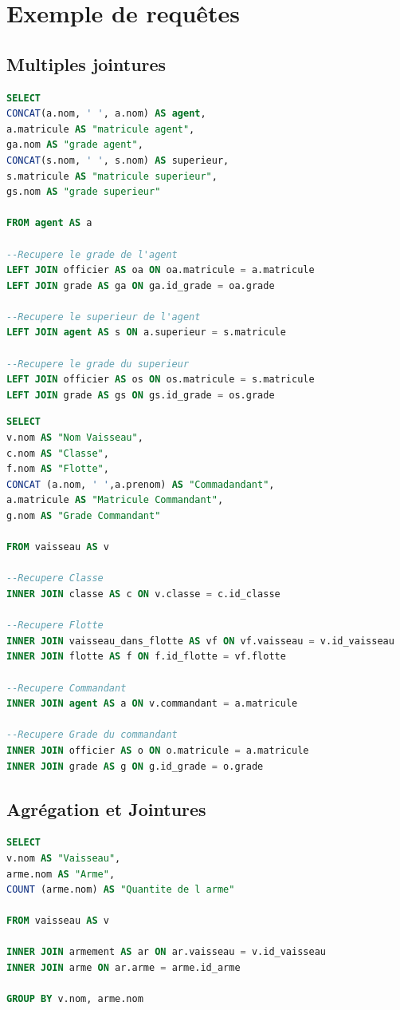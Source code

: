 \section{Exemple de requêtes}

\subsection{Multiples jointures}
\begin{lstlisting}[language=SQL]
SELECT
CONCAT(a.nom, ' ', a.nom) AS agent,
a.matricule AS "matricule agent",
ga.nom AS "grade agent",
CONCAT(s.nom, ' ', s.nom) AS superieur,
s.matricule AS "matricule superieur",
gs.nom AS "grade superieur"

FROM agent AS a

--Recupere le grade de l'agent
LEFT JOIN officier AS oa ON oa.matricule = a.matricule
LEFT JOIN grade AS ga ON ga.id_grade = oa.grade

--Recupere le superieur de l'agent
LEFT JOIN agent AS s ON a.superieur = s.matricule

--Recupere le grade du superieur
LEFT JOIN officier AS os ON os.matricule = s.matricule
LEFT JOIN grade AS gs ON gs.id_grade = os.grade
\end{lstlisting}

\begin{lstlisting}[language=SQL]
SELECT
v.nom AS "Nom Vaisseau",
c.nom AS "Classe",
f.nom AS "Flotte",
CONCAT (a.nom, ' ',a.prenom) AS "Commadandant",
a.matricule AS "Matricule Commandant",
g.nom AS "Grade Commandant"

FROM vaisseau AS v

--Recupere Classe
INNER JOIN classe AS c ON v.classe = c.id_classe

--Recupere Flotte
INNER JOIN vaisseau_dans_flotte AS vf ON vf.vaisseau = v.id_vaisseau
INNER JOIN flotte AS f ON f.id_flotte = vf.flotte

--Recupere Commandant
INNER JOIN agent AS a ON v.commandant = a.matricule

--Recupere Grade du commandant
INNER JOIN officier AS o ON o.matricule = a.matricule
INNER JOIN grade AS g ON g.id_grade = o.grade
\end{lstlisting}

\subsection{Agrégation et Jointures}
\begin{lstlisting}[language=SQL]
SELECT
v.nom AS "Vaisseau",
arme.nom AS "Arme",
COUNT (arme.nom) AS "Quantite de l arme"

FROM vaisseau AS v

INNER JOIN armement AS ar ON ar.vaisseau = v.id_vaisseau
INNER JOIN arme ON ar.arme = arme.id_arme

GROUP BY v.nom, arme.nom
\end{lstlisting}

